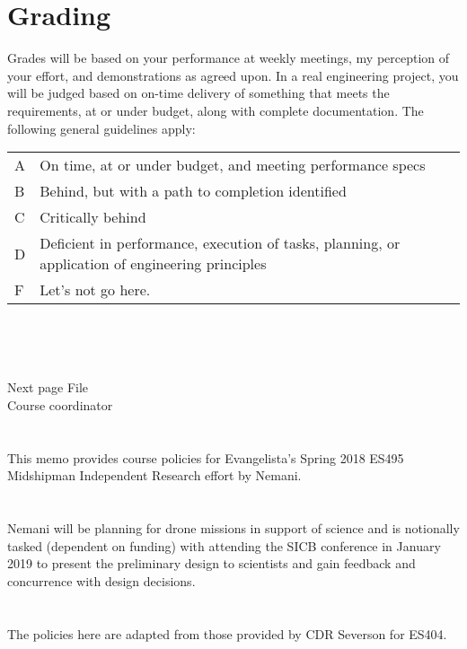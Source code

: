 \documentclass[10pt,courier]{navymemo}
\begin{document}
\section{Grading}
Grades will be based on your performance at weekly meetings, my perception of your effort, and demonstrations as agreed upon.  In a real engineering project, you will be judged based on on-time delivery of something that meets the requirements, at or under budget, along with complete documentation. The following general guidelines apply: 
\begin{center}
\begin{tabular}{lp{5in}}
A & On time, at or under budget, and meeting performance specs \\
B & Behind, but with a path to completion identified \\
C & Critically behind \\
D & Deficient in performance, execution of tasks, planning, or application of engineering principles \\
F & Let's not go here. \\
\end{tabular}
\end{center}

\noclosing{}\\
\noindent\hspace*{4in}
\signature{D Evangelista}
\noindent\hspace*{4in}{235 Maury Hall}\\

\copyto{}
Next page
\clearpage
\copyto{}
File\\
Course coordinator


\navyrecordnote
\thispagestyle{empty}


\navyrecordnotesubjline

\section{} This memo provides course policies for Evangelista's Spring 2018 ES495 Midshipman Independent Research effort by Nemani.

\section{} Nemani will be planning for drone missions in support of science and is notionally tasked (dependent on funding) with attending the SICB conference in January 2019 to present the preliminary design to scientists and gain feedback and concurrence with design decisions.  

\section{} The policies here are adapted from those provided by CDR Severson for ES404.  
\end{document}
